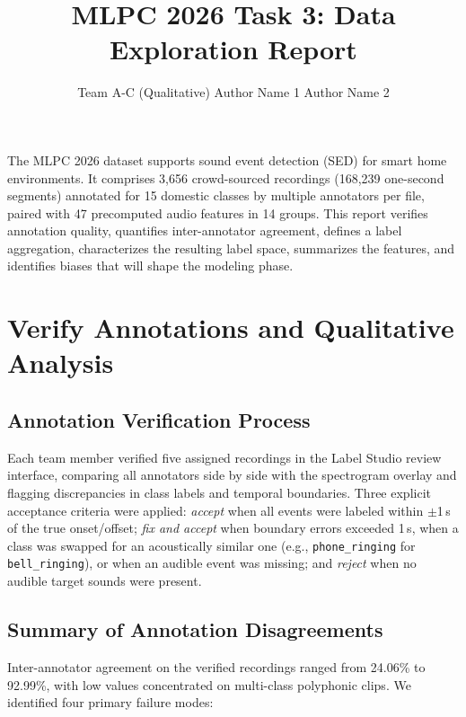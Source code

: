 \documentclass{article}
\title{MLPC 2026 Task 3: Data Exploration Report}
\author{%
  Team A-C (Qualitative) \AND
  Author Name 1
  \And
  Author Name 2
}
\begin{document}
\maketitle

The MLPC 2026 dataset supports sound event detection (SED) for smart home environments. It comprises 3{,}656 crowd-sourced recordings (168{,}239 one-second segments) annotated for 15 domestic classes by multiple annotators per file, paired with 47 precomputed audio features in 14 groups. This report verifies annotation quality, quantifies inter-annotator agreement, defines a label aggregation, characterizes the resulting label space, summarizes the features, and identifies biases that will shape the modeling phase.

\section{Verify Annotations and Qualitative Analysis}

\subsection{Annotation Verification Process}

Each team member verified five assigned recordings in the Label Studio review interface, comparing all annotators side by side with the spectrogram overlay and flagging discrepancies in class labels and temporal boundaries. Three explicit acceptance criteria were applied: \emph{accept} when all events were labeled within $\pm$1\,s of the true onset/offset; \emph{fix and accept} when boundary errors exceeded 1\,s, when a class was swapped for an acoustically similar one (e.g., \texttt{phone\_ringing} for \texttt{bell\_ringing}), or when an audible event was missing; and \emph{reject} when no audible target sounds were present.

\subsection{Summary of Annotation Disagreements}

Inter-annotator agreement on the verified recordings ranged from 24.06\% to 92.99\%, with low values concentrated on multi-class polyphonic clips. We identified four primary failure modes:
\end{document}
